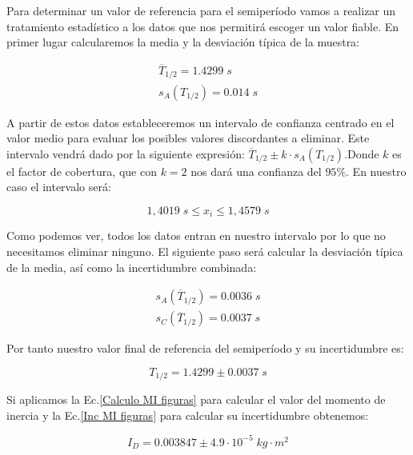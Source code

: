 \documentclass[a4paper,12pt,titlepage]{report}
\begin{document}
Para determinar un valor de referencia para el semiperíodo vamos a realizar un tratamiento estadístico a los datos que nos permitirá escoger un valor fiable. En primer lugar calcularemos la media y la desviación típica de la muestra:

\begin{equation}
    \begin{gathered}
        \overline{T}_{1/2} = 1.4299 \; s\\
        s_A(T_{1/2}) = 0.014 \; s
    \end{gathered}
\end{equation}

A partir de estos datos estableceremos un intervalo de confianza centrado en el valor medio para evaluar los posibles valores discordantes a eliminar. Este intervalo vendrá dado por la siguiente expresión: $\overline{T}_{1/2} \pm k\cdot s_A(T_{1/2})$.Donde $k$ es el factor de cobertura, que con $k=2$ nos dará una confianza del $95\%$. En nuestro caso el intervalo será:

\begin{equation}
    1,4019 \; s \leq x_i \leq 1,4579 \; s
\end{equation}

Como podemos ver, todos los datos entran en nuestro intervalo por lo que no necesitamos eliminar ninguno. El siguiente paso será calcular la desviación típica de la media, así como la incertidumbre combinada:

\begin{equation}
    \begin{gathered}
        s_A(\overline{T}_{1/2}) = 0.0036 \; s\\
        s_C(\overline{T}_{1/2}) = 0.0037 \; s
    \end{gathered}
\end{equation}

Por tanto nuestro valor final de referencia del semiperíodo y su incertidumbre es:

\begin{equation}
    T_{1/2} = 1.4299 \pm 0.0037 \; s
\end{equation}

Si aplicamos la Ec.\ref{Calculo MI figuras} para calcular el valor del momento de inercia y la Ec.\ref{Inc MI figuras} para calcular su incertidumbre obtenemos:

\begin{equation}
    I_D = 0.003847 \pm 4.9 \cdot 10^{-5} \; kg\cdot m^2
\end{equation}
\end{document}
